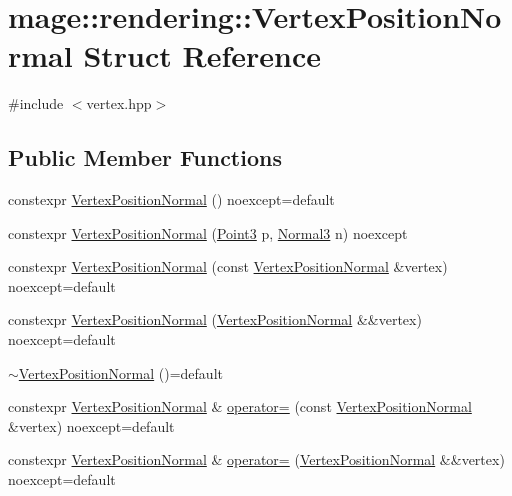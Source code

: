 \hypertarget{structmage_1_1rendering_1_1_vertex_position_normal}{}\section{mage\+:\+:rendering\+:\+:Vertex\+Position\+Normal Struct Reference}
\label{structmage_1_1rendering_1_1_vertex_position_normal}


{\ttfamily \#include $<$vertex.\+hpp$>$}

\subsection*{Public Member Functions}
\begin{DoxyCompactItemize}
\item 
constexpr \hyperlink{structmage_1_1rendering_1_1_vertex_position_normal_afa00dc1c7ed3f8c09dc68ee6e7d1c43f}{Vertex\+Position\+Normal} () noexcept=default
\item 
constexpr \hyperlink{structmage_1_1rendering_1_1_vertex_position_normal_a587edfdfb7feecc7b9d9dfea6c2fe632}{Vertex\+Position\+Normal} (\hyperlink{structmage_1_1_point3}{Point3} p, \hyperlink{structmage_1_1_normal3}{Normal3} n) noexcept
\item 
constexpr \hyperlink{structmage_1_1rendering_1_1_vertex_position_normal_a055a98c2d6f827b94fed59bbed300c9e}{Vertex\+Position\+Normal} (const \hyperlink{structmage_1_1rendering_1_1_vertex_position_normal}{Vertex\+Position\+Normal} \&vertex) noexcept=default
\item 
constexpr \hyperlink{structmage_1_1rendering_1_1_vertex_position_normal_a7d090031c9fce5c0e997d92083bb40d0}{Vertex\+Position\+Normal} (\hyperlink{structmage_1_1rendering_1_1_vertex_position_normal}{Vertex\+Position\+Normal} \&\&vertex) noexcept=default
\item 
\hyperlink{structmage_1_1rendering_1_1_vertex_position_normal_ac5abfb1132d54581b006cd098f533811}{$\sim$\+Vertex\+Position\+Normal} ()=default
\item 
constexpr \hyperlink{structmage_1_1rendering_1_1_vertex_position_normal}{Vertex\+Position\+Normal} \& \hyperlink{structmage_1_1rendering_1_1_vertex_position_normal_ae6eb4c994e2b84cef3c874255633c7a1}{operator=} (const \hyperlink{structmage_1_1rendering_1_1_vertex_position_normal}{Vertex\+Position\+Normal} \&vertex) noexcept=default
\item 
constexpr \hyperlink{structmage_1_1rendering_1_1_vertex_position_normal}{Vertex\+Position\+Normal} \& \hyperlink{structmage_1_1rendering_1_1_vertex_position_normal_ab91c35523dc03eb777f572853b4be633}{operator=} (\hyperlink{structmage_1_1rendering_1_1_vertex_position_normal}{Vertex\+Position\+Normal} \&\&vertex) noexcept=default
\end{DoxyCompactItemize}
